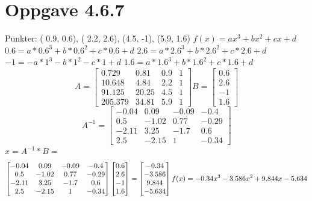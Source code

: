 \documentclass[a4paper,norsk]{article}
\begin{document}
\section{Oppgave 4.6.7}
Punkter: ( 0.9, 0.6), ( 2.2, 2.6), (4.5, -1), (5.9, 1.6) 
\newline
$f(x) = ax^{3} + bx^{2} + cx + d$\newline
$0.6 = a*0.6^{3} + b*0.6^{2} + c*0.6 + d$\newline
$2.6 = a*2.6^{3} + b*2.6^{2} + c*2.6 + d$\newline
$-1 = -a*1^{3} - b*1^{2} - c*1 + d$\newline
$1.6 = a*1.6^{3} + b*1.6^{2} + c*1.6 + d$\newline
\begin{equation*}
A = \begin{bmatrix} 0.729  & 0.81 & 0.9 & 1 \\ 10.648 & 4.84 & 2.2 & 1 \\ 
91.125 & 20.25 & 4.5 & 1 \\  205.379 & 34.81  & 5.9 & 1\end{bmatrix} B = \begin{bmatrix} 0.6 \\ 2.6 \\ -1 \\ 1.6\end{bmatrix}\end{equation*}
\newline
\begin{equation*}
A^{-1} = \begin{bmatrix} -0.04  & 0.09 & -0.09 & -0.4 \\ 0.5 & -1.02 & 0.77 & -0.29 \\ 
-2.11 & 3.25 & -1.7 & 0.6 \\  2.5 & -2.15  & 1 & -0.34 \end{bmatrix}
\end{equation*}
\newline
$x = A^{-1}*B = $
\begin{equation*}
\begin{bmatrix}  -0.04  & 0.09 & -0.09 & -0.4 \\ 0.5 & -1.02 & 0.77 & -0.29 \\ 
-2.11 & 3.25 & -1.7 & 0.6 \\  2.5 & -2.15  & 1 & -0.34  \end{bmatrix} \begin{bmatrix}  0.6 \\ 2.6 \\ -1 \\ 1.6\end{bmatrix}
= \begin{bmatrix} -0.34 \\ - 3.586 \\ 9.844 \\  -5.634 \end{bmatrix}
\newline
f(x) = -0.34x^{3} - 3.586x^{2}+9.844x - 5.634
\end{equation*}
\end{document}
